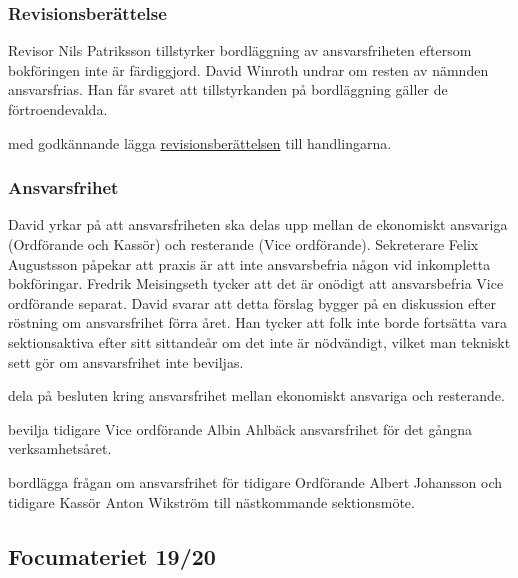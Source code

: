 \documentclass[hidelinks]{../sektionsmote} %
\begin{document}
\subsubsection{Revisionsberättelse}
Revisor Nils Patriksson tillstyrker bordläggning av ansvarsfriheten eftersom bokföringen inte är färdiggjord.
David Winroth undrar om resten av nämnden ansvarsfrias.
Han får svaret att tillstyrkanden på bordläggning gäller de förtroendevalda.
\begin{beslut}
    \item med godkännande lägga \hyperlink{bilagor/snf/rb.pdf.1}{revisionsberättelsen} till handlingarna.
\end{beslut}

\subsubsection{Ansvarsfrihet}
David yrkar på att ansvarsfriheten ska delas upp mellan de ekonomiskt ansvariga (Ordförande och Kassör) och resterande (Vice ordförande).
Sekreterare Felix Augustsson påpekar att praxis är att inte ansvarsbefria någon vid inkompletta bokföringar.
Fredrik Meisingseth tycker att det är onödigt att ansvarsbefria Vice ordförande separat.
David svarar att detta förslag bygger på en diskussion efter röstning om ansvarsfrihet förra året.
Han tycker att folk inte borde fortsätta vara sektionsaktiva efter sitt sittandeår om det inte är nödvändigt, vilket man tekniskt sett gör om ansvarsfrihet inte beviljas.
\begin{beslut}
    \item dela på besluten kring ansvarsfrihet mellan ekonomiskt ansvariga och resterande.
\end{beslut}
\begin{beslut}
    \item bevilja tidigare Vice ordförande Albin Ahlbäck ansvarsfrihet för det gångna verksamhetsåret.
\end{beslut}
\begin{beslut}
    \item bordlägga frågan om ansvarsfrihet för tidigare Ordförande Albert Johansson och tidigare Kassör Anton Wikström till nästkommande sektionsmöte.
\end{beslut}

\subsection{Focumateriet 19/20}
\end{document}
